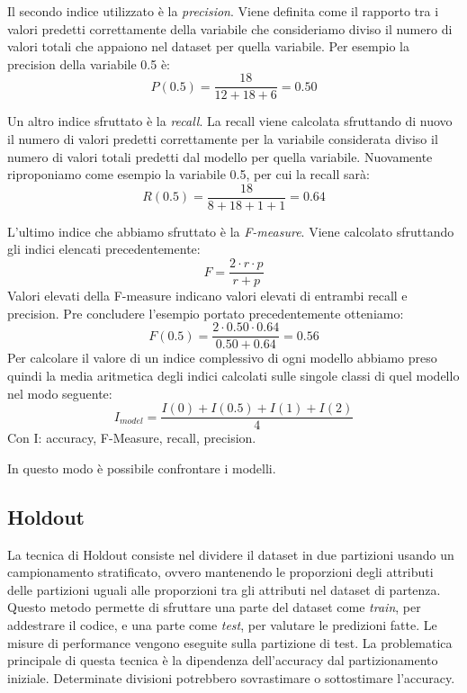 Il secondo indice utilizzato è la \textit{precision}. Viene definita come il rapporto tra i valori predetti correttamente della variabile che consideriamo diviso il numero di valori totali che appaiono nel dataset per quella variabile. Per esempio la precision della variabile 0.5 è:
\[P(0.5) = \frac{18}{12+18+6} = 0.50\]

Un altro indice sfruttato è la \textit{recall}. La recall viene calcolata sfruttando di nuovo il numero di valori predetti correttamente per la variabile considerata diviso il numero di valori totali predetti dal modello per quella variabile. Nuovamente riproponiamo come esempio la variabile 0.5, per cui la recall sarà:
\[R(0.5) = \frac{18}{8+18+1+1} = 0.64\]

L'ultimo indice che abbiamo sfruttato è la \textit{F-measure}. Viene calcolato sfruttando gli indici elencati precedentemente:
\[F = \frac{2\cdot r \cdot p}{r + p}\]
Valori elevati della F-measure indicano valori elevati di entrambi recall e precision. Pre concludere l'esempio portato precedentemente otteniamo:
\[F(0.5) = \frac{2 \cdot 0.50 \cdot 0.64}{0.50 + 0.64}=0.56\]
Per calcolare il valore di un indice complessivo di ogni modello abbiamo preso quindi la media aritmetica degli indici calcolati sulle singole classi di quel modello nel modo seguente:
\[I_{model} = \frac{I(0) + I(0.5)+ I(1) + I(2)}{4}\]
Con I: accuracy, F-Measure, recall, precision.

In questo modo è possibile confrontare i modelli.

\subsection{Holdout}
La tecnica di Holdout consiste nel dividere il dataset in due partizioni usando un campionamento stratificato, ovvero mantenendo le proporzioni degli attributi delle partizioni uguali alle proporzioni tra gli attributi nel dataset di partenza. Questo metodo permette di sfruttare una parte del dataset come \textit{train}, per addestrare il codice, e una parte come \textit{test}, per valutare le predizioni fatte. Le misure di performance vengono eseguite sulla partizione di test. 
La problematica principale di questa tecnica è la dipendenza dell'accuracy dal partizionamento iniziale. Determinate divisioni potrebbero sovrastimare o sottostimare l'accuracy.


